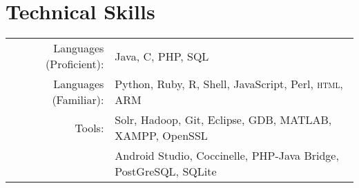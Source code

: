 \documentclass[letterpaper,11pt]{article}
\begin{document}



\section{Technical Skills}

\begin{tabular}{rl}
Languages (Proficient): & Java, C, PHP, SQL \\
Languages (Familiar): & Python, Ruby, R, Shell, JavaScript, Perl, \textsc{html}, ARM \\

Tools: & Solr, Hadoop, Git, Eclipse, GDB, MATLAB, XAMPP, OpenSSL\\
&Android Studio, Coccinelle, PHP-Java Bridge, PostGreSQL, SQLite
\end{tabular}

\end{document}
